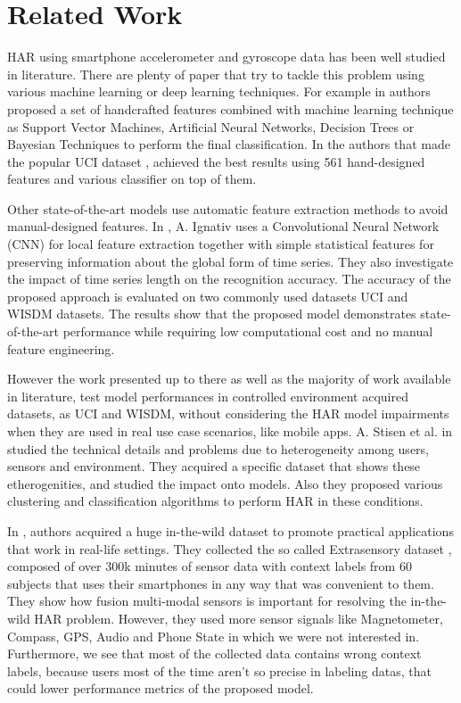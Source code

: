 
\section{Related Work}
\label{sec:related-work}

HAR using smartphone accelerometer and gyroscope data has been well studied in literature. There are plenty of paper that try to tackle this problem using various machine learning or deep learning techniques. For example in \cite{frank2010reliable} authors proposed a set of handcrafted features combined with machine learning technique as Support Vector Machines, Artificial Neural Networks, Decision Trees or Bayesian Techniques to perform the final classification. In \cite{anguita2013public} the authors that made the popular UCI dataset \cite{UCI}, achieved the best results using 561 hand-designed features and various classifier on top of them.  

Other state-of-the-art models use automatic feature extraction methods to avoid manual-designed features. In \cite{ignatov2018real}, A. Ignativ uses a Convolutional Neural
Network (CNN) for local feature extraction together with simple
statistical features for preserving information about the global form
of time series. They also investigate the impact of time series length
on the recognition accuracy. The accuracy of the proposed approach is
evaluated on two commonly used datasets UCI \cite{UCI} and WISDM \cite{WISDM} datasets. The results show that the proposed model
demonstrates state-of-the-art performance while requiring low
computational cost and no manual feature engineering.

However the work presented up to there as well as the majority of work available in literature, test model performances in controlled environment acquired datasets, as UCI and WISDM, without considering the HAR model impairments when they are used in real use case scenarios, like mobile apps. A. Stisen et al. in \cite{stisen2015smart} studied the technical details and
problems due to heterogeneity among users, sensors and
environment. They acquired a specific dataset that shows these etherogenities, and studied the impact onto models. Also they proposed various clustering and classification algorithms to perform HAR in these conditions.

In \cite{vaizman2018extrasensory}, authors acquired a huge in-the-wild dataset to promote practical applications that work in real-life settings. They collected the so called Extrasensory dataset \cite{EXTRASENSORY}, composed of over 300k minutes of sensor data with context labels from 60 subjects that uses their smartphones in any way that was convenient to them. They show how fusion multi-modal sensors is important for resolving the in-the-wild HAR problem.  However, they used more sensor signals like Magnetometer, Compass, GPS, Audio and Phone State in which we were not interested in. Furthermore, we see that most of the collected data contains wrong context labels, because users most of the time aren't so precise in labeling datas, that could lower performance metrics of the proposed model.   


